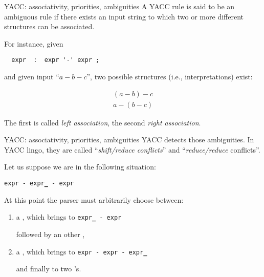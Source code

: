 \begin{frame}[fragile]{YACC: associativity, priorities, ambiguities}
A YACC rule is said to be an ambiguous rule if there exists
an input string to which two or more different structures
can be associated.


\vspace{20pt}

For instance, given


\vspace{20pt}

\begin{verbatim}
  expr  :  expr '-' expr ;
\end{verbatim}


\vspace{20pt}

and given input
``$a-b-c$'', two possible structures (i.e., interpretations)
exist:


\vspace{20pt}

\begin{eqnarray}
(a-b)-c \\
a-(b-c)
\end{eqnarray}


\vspace{20pt}

The first is called {\em left association}, the second
{\em right association}.


\end{frame}
\begin{frame}[fragile]{YACC: associativity, priorities, ambiguities}
YACC detects those ambiguities. In YACC lingo, they are called
``{\em shift/reduce conflicts\/}'' and
``{\em reduce/reduce\/} conflicts''.


\vspace{20pt}

Let us suppose we are in the following situation:
\begin{center}\tt expr - expr{\bf \_} - expr\end{center}
At this point the parser must arbitrarily choose
between:
\begin{enumerate}
\item a \reduce{}, which brings to
{\tt expr{\bf \_} - expr}

followed by an other \reduce,
\item a \shift{}, which brings to
{\tt expr - expr - expr{\bf \_}} 

and finally to two \reduce{}'s.
\end{enumerate}


\end{frame}
